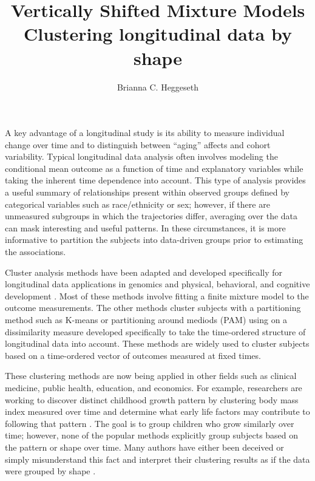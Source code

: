 \documentclass[12pt]{article}
\title{Vertically Shifted Mixture Models \\ Clustering longitudinal data by shape}
\author{Brianna C. Heggeseth}
\begin{document}
\maketitle

A key advantage of a longitudinal study is its ability to measure individual change over time and to distinguish between ``aging'' affects and cohort variability. Typical longitudinal data analysis often involves modeling the conditional mean outcome as a function of time and explanatory variables while taking the inherent time dependence into account. This type of analysis provides a useful summary of relationships present within observed groups defined by categorical variables such as race/ethnicity or sex; however, if there are unmeasured subgroups in which the trajectories differ, averaging over the data can mask interesting and useful patterns. In these circumstances, it is more informative to partition the subjects into data-driven groups prior to estimating the associations.

Cluster analysis methods have been adapted and developed specifically for longitudinal data applications in genomics and physical, behavioral, and cognitive development \cite{schneiderman1993,genolini2010, jones2001, muthen2010, mcnicholas2010}. Most of these methods involve fitting a finite mixture model to the outcome measurements. The other methods cluster subjects with a partitioning method such as K-means \cite{macqueen1967,hartigan1979} or partitioning around mediods (PAM) \cite{kaufman1990} using on a dissimilarity measure developed specifically to take the time-ordered structure of longitudinal data into account. These methods are widely used to cluster subjects based on a time-ordered vector of outcomes measured at fixed times.

These clustering methods are now being applied in other fields such as clinical medicine, public health, education, and economics. For example, researchers are working to discover distinct childhood growth pattern by clustering body mass index measured over time and determine what early life factors may contribute to following that pattern \cite{pryor2011,carter2012}. The goal is to group children who grow similarly over time; however, none of the popular methods explicitly group subjects based on the pattern or shape over time. Many authors have either been deceived or simply misunderstand this fact and interpret their clustering results as if the data were grouped by shape \cite{pryor2011,carter2012,nagin1999}. 
\end{document}
